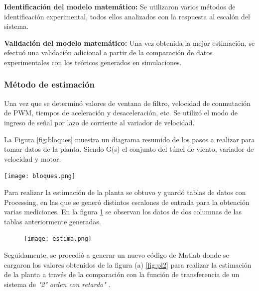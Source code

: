  \textbf{Identificación del modelo matemático:} Se utilizaron varios métodos de identificación experimental, todos ellos analizados con la respuesta al escalón del sistema.

 \textbf{Validación del modelo matemático:} Una vez obtenida la mejor estimación, se efectuó una validación adicional a partir de la comparación de datos experimentales con los teóricos generados en simulaciones.






    \subsubsection{Método de estimación}

    Una vez que se determinó valores de ventana de filtro, velocidad de conmutación de PWM, tiempos de aceleración y desaceleración, etc. Se utilizó el modo de ingreso de señal por lazo de corriente al variador de velocidad. 
    
    La Figura \ref{fig:bloques} muestra un diagrama resumido de los pasos a realizar para tomar datos de la planta. Siendo G(s) el conjunto del túnel de viento, variador de velocidad y motor.
 
    \begin{center}
    	\texttt{[image: bloques.png]}
    	\label{fig:bloques}    
    \end{center}
    
    Para realizar la estimación de la planta se obtuvo y guardó tablas de datos con Processing, en las que se generó distintos escalones de entrada para la obtención varias mediciones. En la figura \ref{fig:est2} se observan los datos de dos columnas de las tablas anteriormente generadas.
    
    \begin{figure}[htb]
    	\centering
    	\texttt{[image: estima.png]} %
    	\label{fig:est2}    
    \end{figure}
    
    Seguidamente, se procedió a generar un nuevo código de Matlab donde se cargaron los valores obtenidos de la figura (a) \ref{fig:pl2} para realizar la estimación de la planta a través de la comparación con la función de transferencia de un sistema de \textit{"2° orden con retardo"} \cite{pomares2011sistemas}.
    
